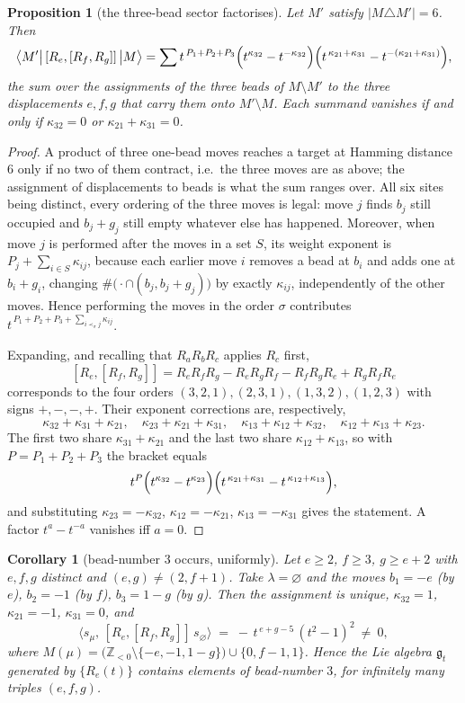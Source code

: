 \documentclass[11pt]{article}
\newtheorem{proposition}[theorem]{Proposition}
\newtheorem{corollary}[theorem]{Corollary}
\theoremstyle{definition}
\newcommand{\Z}{\mathbb{Z}}
\begin{document}
\begin{proposition}[the three-bead sector factorises]\label{prop:three}
Let $M'$ satisfy $|M\triangle M'|=6$.  Then
\[
 \bigl\langle M'\bigl|\,[R_e,[R_f,R_g]]\,\bigr|M\bigr\rangle
 =\sum t^{\,P_1+P_2+P_3}\Bigl(t^{\kappa_{32}}-t^{-\kappa_{32}}\Bigr)
   \Bigl(t^{\,\kappa_{21}+\kappa_{31}}-t^{-(\kappa_{21}+\kappa_{31})}\Bigr),
\]
the sum over the assignments of the three beads of $M\setminus M'$ to the three
displacements $e,f,g$ that carry them onto $M'\setminus M$.  Each summand vanishes if and
only if $\kappa_{32}=0$ or $\kappa_{21}+\kappa_{31}=0$.
\end{proposition}

\begin{proof}
A product of three one-bead moves reaches a target at Hamming distance $6$ only if no two
of them contract, i.e.\ the three moves are as above; the assignment of displacements to
beads is what the sum ranges over.  All six sites being distinct, every ordering of the
three moves is legal: move $j$ finds $b_j$ still occupied and $b_j+g_j$ still empty
whatever else has happened.  Moreover, when move $j$ is performed after the moves in a
set $S$, its weight exponent is $P_j+\sum_{i\in S}\kappa_{ij}$, because each earlier move
$i$ removes a bead at $b_i$ and adds one at $b_i+g_i$, changing
$\#\bigl(\cdot\cap(b_j,b_j+g_j)\bigr)$ by exactly $\kappa_{ij}$, independently of the
other moves.  Hence performing the moves in the order $\sigma$ contributes
$t^{\,P_1+P_2+P_3+\sum_{i\prec_\sigma j}\kappa_{ij}}$.

Expanding, and recalling that $R_aR_bR_c$ applies $R_c$ first,
\[
 [R_e,[R_f,R_g]]=R_eR_fR_g-R_eR_gR_f-R_fR_gR_e+R_gR_fR_e
\]
corresponds to the four orders $(3,2,1),(2,3,1),(1,3,2),(1,2,3)$ with signs
$+,-,-,+$.  Their exponent corrections are, respectively,
\[
 \kappa_{32}+\kappa_{31}+\kappa_{21},\quad
 \kappa_{23}+\kappa_{21}+\kappa_{31},\quad
 \kappa_{13}+\kappa_{12}+\kappa_{32},\quad
 \kappa_{12}+\kappa_{13}+\kappa_{23}.
\]
The first two share $\kappa_{31}+\kappa_{21}$ and the last two share
$\kappa_{12}+\kappa_{13}$, so with $P=P_1+P_2+P_3$ the bracket equals
\[
 t^{P}\Bigl(t^{\kappa_{32}}-t^{\kappa_{23}}\Bigr)
      \Bigl(t^{\,\kappa_{21}+\kappa_{31}}-t^{\,\kappa_{12}+\kappa_{13}}\Bigr),
\]
and substituting $\kappa_{23}=-\kappa_{32}$, $\kappa_{12}=-\kappa_{21}$,
$\kappa_{13}=-\kappa_{31}$ gives the statement.  A factor $t^{a}-t^{-a}$ vanishes iff
$a=0$.
\end{proof}

\begin{corollary}[bead-number $3$ occurs, uniformly]\label{cor:three}
Let $e\ge2$, $f\ge3$, $g\ge e+2$ with $e,f,g$ distinct and $(e,g)\ne(2,f+1)$.  Take
$\lambda=\varnothing$ and the moves $b_1=-e$ (by $e$), $b_2=-1$ (by $f$), $b_3=1-g$ (by
$g$).  Then the assignment is unique, $\kappa_{32}=1$, $\kappa_{21}=-1$, $\kappa_{31}=0$,
and
\[
 \bigl\langle s_\mu,\,[R_e,[R_f,R_g]]\,s_\varnothing\bigr\rangle
 \;=\;-\,t^{\,e+g-5}\,(t^{2}-1)^{2}\ \ne\ 0,
\]
where $M(\mu)=\bigl(\Z_{<0}\setminus\{-e,-1,1-g\}\bigr)\cup\{0,f-1,1\}$.  Hence the Lie
algebra $\mathfrak g_t$ generated by $\{R_e(t)\}$ contains elements of bead-number $3$,
for infinitely many triples $(e,f,g)$.
\end{corollary}
\end{document}
